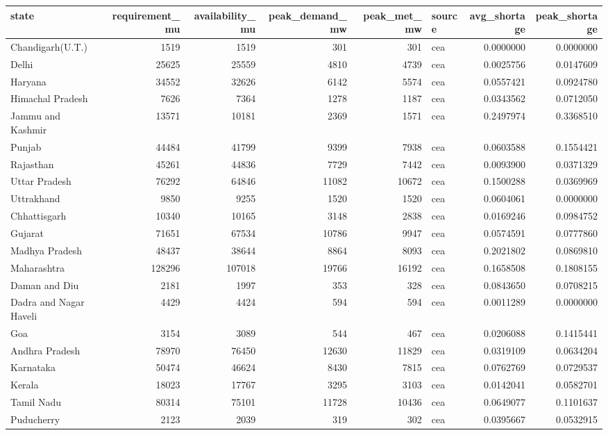 
\begin{tabular}{lrrrrlrr}
\toprule
state & requirement\_mu & availability\_mu & peak\_demand\_mw & peak\_met\_mw & source & avg\_shortage & peak\_shortage\\
\midrule
Chandigarh(U.T.) & 1519 & 1519 & 301 & 301 & cea & 0.0000000 & 0.0000000\\
Delhi & 25625 & 25559 & 4810 & 4739 & cea & 0.0025756 & 0.0147609\\
Haryana & 34552 & 32626 & 6142 & 5574 & cea & 0.0557421 & 0.0924780\\
Himachal Pradesh & 7626 & 7364 & 1278 & 1187 & cea & 0.0343562 & 0.0712050\\
Jammu and Kashmir & 13571 & 10181 & 2369 & 1571 & cea & 0.2497974 & 0.3368510\\
\addlinespace
Punjab & 44484 & 41799 & 9399 & 7938 & cea & 0.0603588 & 0.1554421\\
Rajasthan & 45261 & 44836 & 7729 & 7442 & cea & 0.0093900 & 0.0371329\\
Uttar Pradesh & 76292 & 64846 & 11082 & 10672 & cea & 0.1500288 & 0.0369969\\
Uttrakhand & 9850 & 9255 & 1520 & 1520 & cea & 0.0604061 & 0.0000000\\
Chhattisgarh & 10340 & 10165 & 3148 & 2838 & cea & 0.0169246 & 0.0984752\\
\addlinespace
Gujarat & 71651 & 67534 & 10786 & 9947 & cea & 0.0574591 & 0.0777860\\
Madhya Pradesh & 48437 & 38644 & 8864 & 8093 & cea & 0.2021802 & 0.0869810\\
Maharashtra & 128296 & 107018 & 19766 & 16192 & cea & 0.1658508 & 0.1808155\\
Daman and Diu & 2181 & 1997 & 353 & 328 & cea & 0.0843650 & 0.0708215\\
Dadra and Nagar Haveli & 4429 & 4424 & 594 & 594 & cea & 0.0011289 & 0.0000000\\
\addlinespace
Goa & 3154 & 3089 & 544 & 467 & cea & 0.0206088 & 0.1415441\\
Andhra Pradesh & 78970 & 76450 & 12630 & 11829 & cea & 0.0319109 & 0.0634204\\
Karnataka & 50474 & 46624 & 8430 & 7815 & cea & 0.0762769 & 0.0729537\\
Kerala & 18023 & 17767 & 3295 & 3103 & cea & 0.0142041 & 0.0582701\\
Tamil Nadu & 80314 & 75101 & 11728 & 10436 & cea & 0.0649077 & 0.1101637\\
\addlinespace
Puducherry & 2123 & 2039 & 319 & 302 & cea & 0.0395667 & 0.0532915\\

\end{tabular}
